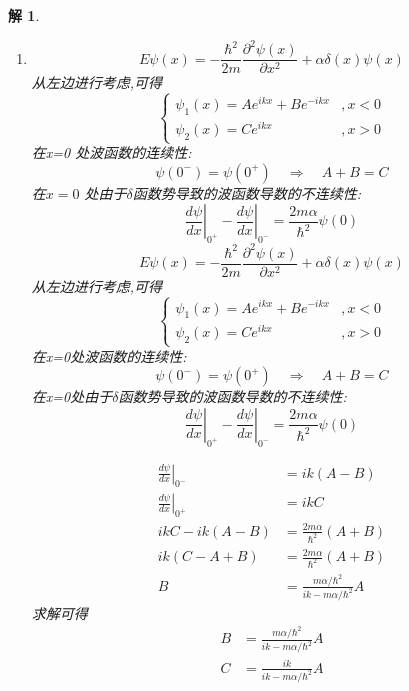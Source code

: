 \documentclass{article}
\newtheorem{solution}{解}
\begin{document}
\begin{solution}
    \begin{enumerate}
        \item \[E\psi(x)=-\frac{\hbar^{2}}{2m}\frac{\partial^{2}\psi(x)}{\partial x^{2}}+\alpha\delta(x)\psi(x)\]
            从左边进行考虑,可得 
            \[\left\{\begin{array}{ll}\psi_1(x)=Ae^{ikx}+Be^{-ikx}&,x<0\\\psi_2(x)=Ce^{ikx}&,x>0\end{array}\right. \]
            在x=0 处波函数的连续性: 
            \[\psi(0^{-})=\psi(0^{+})\quad\Rightarrow\quad A+B=C \]
            在$x=0$ 处由于$\delta$函数势导致的波函数导数的不连续性: 
            \[\left.\frac{d\psi}{dx}\right|_{0^{+}}-\left.\frac{d\psi}{dx}\right|_{0^{-}}=\frac{2m\alpha}{\hbar^{2}}\psi(0)\]
            \[E\psi(x)=-\frac{\hbar^{2}}{2m}\frac{\partial^{2}\psi(x)}{\partial x^{2}}+\alpha\delta(x)\psi(x) \]
            从左边进行考虑,可得
            \[\left\{\begin{array}{ll}\psi_1(x)=Ae^{ikx}+Be^{-ikx}&,x<0\\\psi_2(x)=Ce^{ikx}&,x>0\end{array}\right. \]
            在x=0处波函数的连续性: 
            \[\psi(0^{-})=\psi(0^{+})\quad\Rightarrow\quad A+B=C \]
            在x=0处由于$\delta$函数势导致的波函数导数的不连续性: 
            \[\left.\frac{d\psi}{dx}\right|_{0^{+}}-\left.\frac{d\psi}{dx}\right|_{0^{-}}=\frac{2m\alpha}{\hbar^{2}}\psi(0)\]

            
                \begin{align*}
                    \left.\frac{d\psi}{dx}\right|_{0^-}&=ik(A-B) \\
                    \left.\frac{d\psi}{dx}\right|_{0^+}&=ikC \\
                    ikC-ik(A-B) &=\frac{2m\alpha}{\hbar^{2}}(A+B) \\
                    ik(C-A+B) &=\frac{2m\alpha}{\hbar^{2}}(A+B) \\
                    B&=\frac{m\alpha/\hbar^{2}}{ik-m\alpha/\hbar^{2}}A 
                \end{align*}
                求解可得
                \begin{align*}
                    B&=\frac{m\alpha/\hbar^{2}}{ik-m\alpha/\hbar^{2}}A \\
                    C&=\frac{ik}{ik-m\alpha/\hbar^{2}}A 
                \end{align*}
                

\end{enumerate}
\end{solution}
\end{document}
